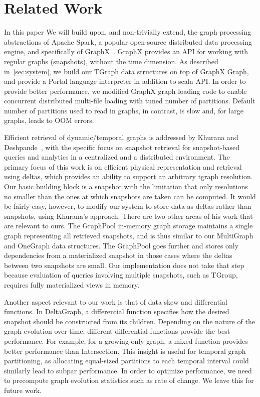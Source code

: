 \section{Related Work}
\label{sec:related}

In this paper We will build upon, and non-trivially extend, the graph
processing abstractions of Apache Spark, a popular open-source
distributed data processing engine, and specifically of
GraphX~\cite{DBLP:conf/osdi/GonzalezXDCFS14}.  GraphX provides an API
for working with regular graphs (snapshots), without the time
dimension.  As described in~\ref{sec:system}, we build our TGraph data
structures on top of GraphX Graph, and provide a Portal language
interpreter in addition to scala API.  In order to provide better
performance, we modified GraphX graph loading code to enable
concurrent distributed multi-file loading with tuned number of
partitions.  Default number of partitions used to read in graphs, in
contrast, is slow and, for large graphs, leads to OOM errors. 

Efficient retrieval of dynamic/temporal graphs is addressed by Khurana
and Deshpande~\cite{Khurana2003}, with the specific focus on snapshot
retrieval for snapshot-based queries and analytics in a centralized
and a distributed environment.  The primary focus of this work is on
efficient physical representation and retrieval using deltas, which
provides an ability to support an arbitrary tgraph resolution.  Our
basic building block is a snapshot with the limitation that only
resolutions no smaller than the ones at which snapshots are taken can
be computed.  It would be fairly easy, however, to modify our system
to store data as deltas rather than snapshots, using Khurana's
approach.  There are two other areas of his work that are relevant to
ours.  The GraphPool in-memory graph storage maintains a single graph
representing all retrieved snapshots, and is thus similar to our
MultiGraph and OneGraph data structures.  The GraphPool goes further
and stores only dependencies from a materialized snapshot in those
cases where the deltas between two snapshots are small.  Our
implementation does not take that step because evaluation of queries
involving multiple snapshots, such as TGroup, requires fully
materialized views in memory.

Another aspect relevant to our work is that of data skew and
differential functions.  In DeltaGraph, a differential function
specifies how the desired snapshot should be constructed from its
children.  Depending on the nature of the graph evolution over time,
different differential functions provide the best performance.  For
example, for a growing-only graph, a mixed function provides better
performance than Intersection.  This insight is useful for temporal
graph partitioning, as allocating equal-sized partitions to each
temporal interval could similarly lead to subpar performance.  In order
to optimize performance, we need to precompute graph evolution
statistics such as rate of change.  We leave this for future
work. 

